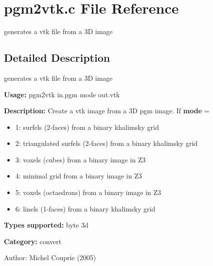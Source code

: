 \section{pgm2vtk.c File Reference}
\label{pgm2vtk_8c}
generates a vtk file from a 3D image  




\label{_details}
\subsection{Detailed Description}
generates a vtk file from a 3D image 

{\bf Usage:} pgm2vtk in.pgm mode out.vtk

{\bf Description:} Create a vtk image from a 3D pgm image. If {\bf mode} = \begin{itemize}
\item 1: surfels (2-faces) from a binary khalimsky grid \item 2: triangulated surfels (2-faces) from a binary khalimsky grid \item 3: voxels (cubes) from a binary image in Z3 \item 4: minimal grid from a binary image in Z3 \item 5: voxels (octaedrons) from a binary image in Z3 \item 6: linels (1-faces) from a binary khalimsky grid\end{itemize}
{\bf Types supported:} byte 3d

{\bf Category:} convert

\begin{Desc}
\item[Author:]Michel Couprie (2005) \end{Desc}
